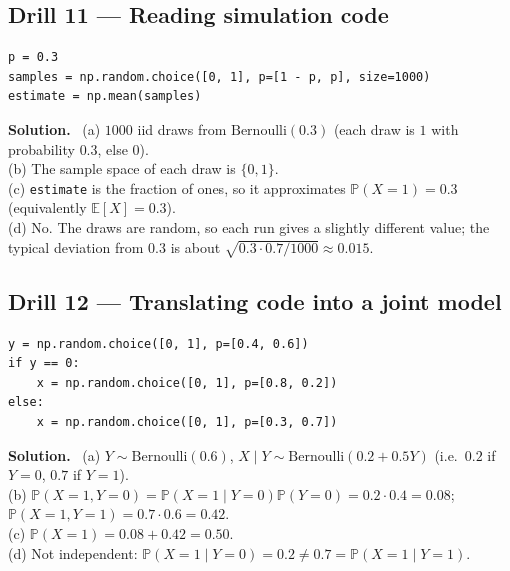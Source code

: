 \documentclass[11pt]{article}
\newcommand{\E}{\mathbb{E}}
\renewcommand{\P}{\mathbb{P}}
\newcommand{\Bern}{\text{Bernoulli}}
\newcommand{\py}[1]{\texttt{#1}}
\newenvironment{soln}{\par\smallskip\noindent\textbf{Solution.}\ }{\par\medskip}
\begin{document}
\subsection*{Drill 11 --- Reading simulation code}
\begin{lstlisting}
p = 0.3
samples = np.random.choice([0, 1], p=[1 - p, p], size=1000)
estimate = np.mean(samples)
\end{lstlisting}
\begin{soln}
(a) $1000$ iid draws from $\Bern(0.3)$ (each draw is $1$ with probability $0.3$, else $0$).\\
(b) The sample space of each draw is $\{0,1\}$.\\
(c) \py{estimate} is the fraction of ones, so it approximates $\P(X{=}1)=0.3$ (equivalently $\E[X]=0.3$).\\
(d) No. The draws are random, so each run gives a slightly different value; the typical deviation from $0.3$ is about $\sqrt{0.3\cdot0.7/1000}\approx0.015$.
\end{soln}

\subsection*{Drill 12 --- Translating code into a joint model}
\begin{lstlisting}
y = np.random.choice([0, 1], p=[0.4, 0.6])
if y == 0:
    x = np.random.choice([0, 1], p=[0.8, 0.2])
else:
    x = np.random.choice([0, 1], p=[0.3, 0.7])
\end{lstlisting}
\begin{soln}
(a) $Y\sim\Bern(0.6)$, $X\mid Y\sim\Bern(0.2+0.5Y)$ (i.e.\ $0.2$ if $Y=0$, $0.7$ if $Y=1$).\\
(b) $\P(X{=}1,Y{=}0)=\P(X{=}1\mid Y{=}0)\P(Y{=}0)=0.2\cdot0.4=0.08$; $\P(X{=}1,Y{=}1)=0.7\cdot0.6=0.42$.\\
(c) $\P(X{=}1)=0.08+0.42=0.50$.\\
(d) Not independent: $\P(X{=}1\mid Y{=}0)=0.2\ne0.7=\P(X{=}1\mid Y{=}1)$.
\end{soln}
\end{document}

